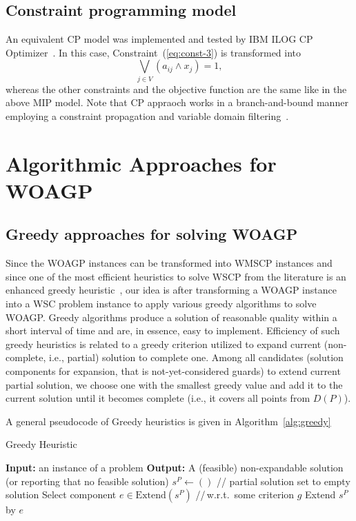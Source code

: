 \documentclass[runningheads,a4paper]{elsarticle}
\begin{document}
	\subsection{Constraint programming model} An equivalent CP model was implemented and tested by IBM ILOG CP Optimizer~\cite{laborie2018ibm}. In this case,  Constraint~(\ref{eq:const-3}) is transformed into
	\begin{equation}
	\bigvee_{ j \in V } (a_{ij} \wedge x_j) = 1,
	\end{equation}
	whereas the other constraints and the objective function are the same like in the above MIP model. Note that CP appraoch works in a branch-and-bound manner employing a constraint propagation and variable domain filtering~\cite{rossi2006handbook}.
	\section{Algorithmic Approaches for WOAGP}
	\subsection{Greedy approaches for solving WOAGP}
	Since the WOAGP instances can be transformed into  WMSCP instances and since one of the most efficient heuristics to solve WSCP from the literature is an enhanced greedy heuristic~\cite{chvatal1979greedy}, our idea is after transforming a WOAGP instance into a WSC problem instance to	apply various greedy algorithms to solve WOAGP. Greedy algorithms produce a solution of reasonable quality within a short interval of time and are, in essence, easy to implement. Efficiency of such greedy heuristics is related to a greedy criterion utilized to expand current (non-complete, i.e., partial) solution to complete one. Among all candidates (solution components for expansion, that is not-yet-considered guards) to extend current partial solution,  we choose one with the smallest greedy value and add it to the current solution until it becomes complete (i.e., it covers all  points from $D(P)$).
	
	A general pseudocode of Greedy heuristics is given in Algorithm~\ref{alg:greedy}
	
	\begin{algorithm}[!t]
		\caption{Greedy Heuristic}\label{alg:greedy}
		\begin{algorithmic}[1]
			\State \textbf{Input:} an instance of a problem
			\State \textbf{Output:} A (feasible) non-expandable solution (or reporting that no feasible solution)
			\State $s^{P} \gets ()$ \hspace{0.3cm}// partial solution set to empty solution
			\State Select component $e \in  \text{Extend}(s^{P})$ \hspace{0.3cm}//\,w.r.t.\  some criterion $g$
			\State Extend $s^{P}$ by $e$
			\EndWhile
		\end{algorithmic}
	\end{algorithm}
\end{document}
